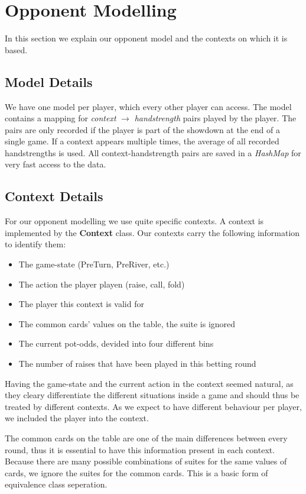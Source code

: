 \section{Opponent Modelling}
In this section we explain our opponent model and the contexts on which it is based.

\subsection{Model Details}
We have one model per player, which every other player can access. The model contains a mapping for \textit{context}
$ \rightarrow $ \textit{handstrength} pairs played by the player. The pairs are only recorded if the player is part of the showdown at
the end of a single game. If a context appears multiple times, the average of all recorded handstrengths is used. All
context-handstrength pairs are saved in a \textit{HashMap} for very fast access to the data.

\subsection{Context Details}
For our opponent modelling we use quite specific contexts. A context is implemented by the \textbf{Context} class.
Our contexts carry the following information to identify them:
\begin{itemize}
    \item The game-state (PreTurn, PreRiver, etc.)
    \item The action the player playen (raise, call, fold)
    \item The player this context is valid for
    \item The common cards' values on the table, the suite is ignored
    \item The current pot-odds, devided into four different bins
    \item The number of raises that have been played in this betting round
\end{itemize}
Having the game-state and the current action in the context seemed natural, as they cleary differentiate the different
situations inside a game and should thus be treated by different contexts. As we expect to have different behaviour per
player, we included the player into the context.

The common cards on the table are one of the main differences between every round, thus it is essential to have this
information present in each context. Because there are many possible combinations of suites for the same values of
cards, we ignore the suites for the common cards. This is a basic form of equivalence class seperation.

